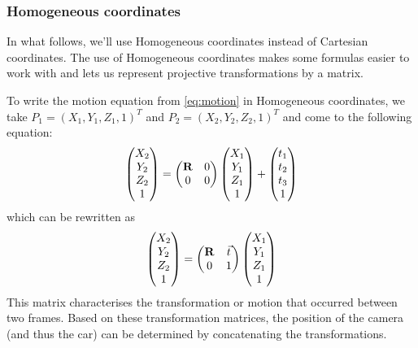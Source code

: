 \subsubsection{Homogeneous coordinates}
In what follows, we'll use Homogeneous coordinates instead of Cartesian coordinates. The use of Homogeneous coordinates makes some formulas easier to work with and lets us represent projective transformations by a matrix. \bigskip

To write the motion equation from \autoref{eq:motion} in Homogeneous coordinates, we take $P_1 = (X_1, Y_1, Z_1, 1)^T$ and $P_2 = (X_2, Y_2, Z_2, 1)^T$ and come to the following equation:
\begin{equation}
    \begin{pmatrix}
        X_2 \\ Y_2 \\ Z_2 \\ 1
    \end{pmatrix} = \begin{pmatrix}
        \mathbf{R} & 0 \\
        0 & 0
    \end{pmatrix} \begin{pmatrix}
        X_1 \\ Y_1 \\ Z_1 \\ 1
    \end{pmatrix} + \begin{pmatrix}
        t_1 \\ t_2 \\ t_3 \\ 1
    \end{pmatrix}
\end{equation}
which can be rewritten as
\begin{equation}
    \begin{pmatrix}
        X_2 \\ Y_2 \\ Z_2 \\ 1
    \end{pmatrix} = \begin{pmatrix}
        \mathbf{R} & \vec t \\
        0 & 1
    \end{pmatrix} \begin{pmatrix}
        X_1 \\ Y_1 \\ Z_1 \\ 1
    \end{pmatrix}
\end{equation}
This matrix characterises the transformation or motion that occurred between two frames. Based on these transformation matrices, the position of the camera (and thus the car) can be determined by concatenating the transformations.

